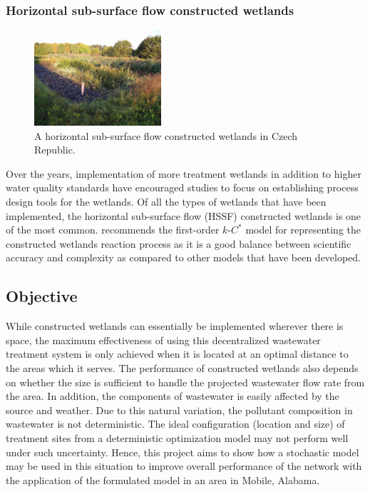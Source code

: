 \documentclass[preprint,12pt,authoryear]{elsarticle}
\begin{document}
\subsubsection{Horizontal sub-surface flow constructed wetlands}
\begin{figure}
	\begin{center}
		\includegraphics[width=0.42\textwidth]{hssf.jpg}
	\end{center}
	\caption[A horizontal sub-surface flow constructed wetlands in Czech Republic.]{A horizontal sub-surface flow constructed wetlands in Czech Republic. \citep{vymazal2008}} 
	\label{fig:changi}
\end{figure}
Over the years, implementation of more treatment wetlands in addition to higher water quality standards have encouraged studies to focus on establishing process design tools for the wetlands. Of all the types of wetlands that have been implemented, the horizontal sub-surface flow (HSSF) constructed wetlands is one of the most common. \cite{rousseau2004model} recommends the first-order $k$-$C^*$ model for representing the constructed wetlands reaction process as it is a good balance between scientific accuracy and complexity as compared to other models that have been developed. 

\subsection{Objective}
While constructed wetlands can essentially be implemented wherever there is space, the maximum effectiveness of using this decentralized wastewater treatment system is only achieved when it is located at an optimal distance to the areas which it serves. The performance of constructed wetlands also depends on whether the size is sufficient to handle the projected wastewater flow rate from the area. In addition, the components of wastewater is easily affected by the source and weather. Due to this natural variation, the pollutant composition in wastewater is not deterministic. The ideal configuration (location and size) of treatment sites from a deterministic optimization model may not perform well under such uncertainty. Hence, this project aims to show how a stochastic model may be used in this situation to improve overall performance of the network with the application of the formulated model in an area in Mobile, Alabama. 
\end{document}
